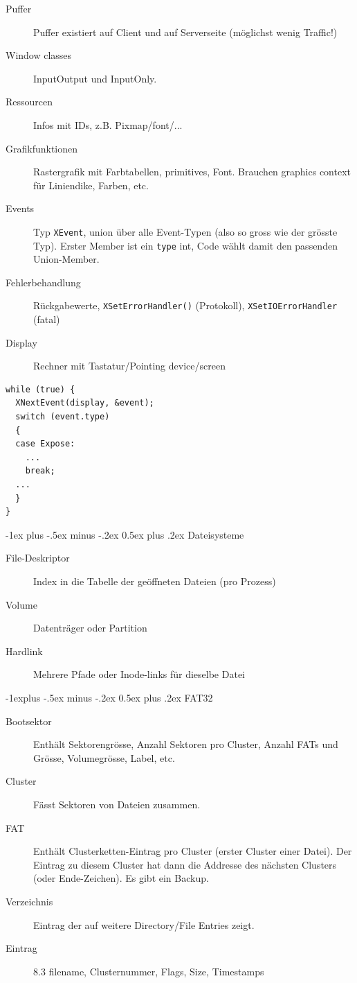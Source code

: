 \documentclass[10pt,landscape,a4paper]{article}
\makeatletter
\renewcommand{\section}{\@startsection{section}{1}{0mm}%
                                {-1ex plus -.5ex minus -.2ex}%
                                {0.5ex plus .2ex}%
                                {\normalfont\large\bfseries}}
\renewcommand{\subsection}{\@startsection{subsection}{2}{0mm}%
                                {-1explus -.5ex minus -.2ex}%
                                {0.5ex plus .2ex}%
                                {\normalfont\small\bfseries}}
\makeatother
\begin{document}
\begin{multicols*}{3}
\begin{description}
  \item[Puffer] Puffer existiert auf Client und auf Serverseite (möglichst wenig Traffic!)
  \item[Window classes] InputOutput und InputOnly.
  \item[Ressourcen] Infos mit IDs, z.B. Pixmap/font/...
  \item[Grafikfunktionen] Rastergrafik mit Farbtabellen, primitives, Font.
    Brauchen graphics context für Liniendike, Farben, etc.
  \item[Events] Typ \verb|XEvent|, union über alle Event-Typen (also so gross
    wie der grösste Typ). Erster Member ist ein \verb|type| int, Code wählt
    damit den passenden Union-Member.
  \item[Fehlerbehandlung] Rückgabewerte, \verb|XSetErrorHandler()| (Protokoll),
    \verb|XSetIOErrorHandler| (fatal)
  \item[Display] Rechner mit Tastatur/Pointing device/screen
\end{description}

\begin{verbatim}
while (true) {
  XNextEvent(display, &event);
  switch (event.type) 
  {
  case Expose:
    ...
    break;
  ...
  }
}
\end{verbatim}

\section{Dateisysteme}

\begin{description}
  \item[File-Deskriptor] Index in die Tabelle der geöffneten Dateien (pro Prozess)
  \item[Volume] Datenträger oder Partition
  \item[Hardlink] Mehrere Pfade oder Inode-links für dieselbe Datei
\end{description}

\subsection{FAT32}

\begin{description}
  \item[Bootsektor] Enthält Sektorengrösse, Anzahl Sektoren pro Cluster, Anzahl
    FATs und Grösse, Volumegrösse, Label, etc.
  \item[Cluster] Fässt Sektoren von Dateien zusammen.
  \item[FAT] Enthält Clusterketten-Eintrag pro Cluster (erster Cluster einer Datei). Der
    Eintrag zu diesem Cluster hat dann die Addresse des nächsten Clusters (oder
    Ende-Zeichen). Es gibt ein Backup.
  \item[Verzeichnis] Eintrag der auf weitere Directory/File Entries zeigt.
  \item[Eintrag] 8.3 filename, Clusternummer, Flags, Size, Timestamps
\end{description}


\end{multicols*}
\end{document}
